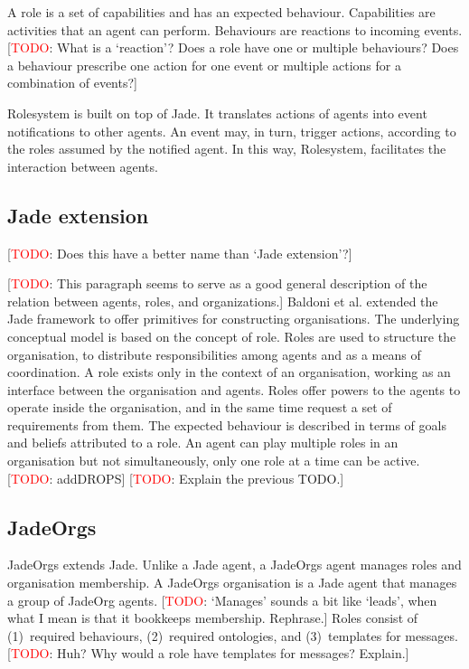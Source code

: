 \documentclass{article}
\newcommand{\todo}[1]{[\textcolor{red}{TODO}: #1]}
\begin{document}
A role is a set of capabilities and has an expected behaviour.
Capabilities are activities that an agent can perform. Behaviours
are reactions to incoming events. \todo{What is a `reaction'?
Does a role have one or multiple behaviours? Does a behaviour
prescribe one action for one event or multiple actions for a
combination of events?}

Rolesystem is built on top of Jade. It translates actions of
agents into event notifications to other agents. An event may,
in turn, trigger actions, according to the roles assumed by
the notified agent. In this way, Rolesystem, facilitates the
interaction between agents.

\subsection{Jade extension}

\todo{Does this have a better name than `Jade extension'?}

\todo{This paragraph seems to serve as a good general description
of the relation between agents, roles, and organizations.}
Baldoni et al. extended the Jade framework to offer primitives
for constructing organisations. The underlying conceptual model
is based on the concept of role. Roles are used to structure the
organisation, to distribute responsibilities among agents and as
a means of coordination. A role exists only in the context of an
organisation, working as an interface between the organisation and
agents. Roles offer powers to the agents to operate inside the
organisation, and in the same time request a set of requirements
from them. The expected behaviour is described in terms of goals and
beliefs attributed to a role. An agent can play multiple roles in an
organisation but not simultaneously, only one role at a time can be
active. \todo{addDROPS} \todo{Explain the previous TODO.}

\subsection{JadeOrgs}

JadeOrgs extends Jade. Unlike a Jade agent, a JadeOrgs
agent manages roles and organisation membership. A JadeOrgs
organisation is a Jade agent that manages a group of JadeOrg
agents. \todo{`Manages' sounds a bit like `leads', when what I
mean is that it bookkeeps membership. Rephrase.} Roles consist
of (1)~required behaviours, (2)~required ontologies, and
(3)~templates for messages. \todo{Huh? Why would a role have
templates for messages? Explain.}
\end{document}
